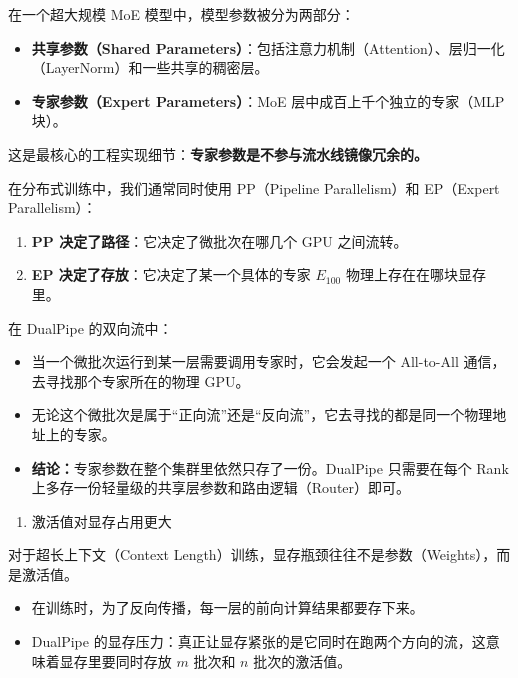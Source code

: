 在一个超大规模 MoE 模型中，模型参数被分为两部分：

\begin{itemize}
\tightlist
\item
  \textbf{共享参数（Shared Parameters）}：包括注意力机制（Attention）、层归一化（LayerNorm）和一些共享的稠密层。
\item
  \textbf{专家参数（Expert Parameters）}：MoE 层中成百上千个独立的专家（MLP 块）。
\end{itemize}

这是最核心的工程实现细节：\textbf{专家参数是不参与流水线镜像冗余的。}

在分布式训练中，我们通常同时使用 PP（Pipeline Parallelism）和 EP（Expert Parallelism）：

\begin{enumerate}
\def\labelenumi{\arabic{enumi}.}
\tightlist
\item
  \textbf{PP 决定了路径}：它决定了微批次在哪几个 GPU 之间流转。
\item
  \textbf{EP 决定了存放}：它决定了某一个具体的专家 \(E_{100}\) 物理上存在在哪块显存里。
\end{enumerate}

在 DualPipe 的双向流中：

\begin{itemize}
\tightlist
\item
  当一个微批次运行到某一层需要调用专家时，它会发起一个 All-to-All 通信，去寻找那个专家所在的物理 GPU。
\item
  无论这个微批次是属于``正向流''还是``反向流''，它去寻找的都是同一个物理地址上的专家。
\item
  \textbf{结论：}专家参数在整个集群里依然只存了一份。DualPipe 只需要在每个 Rank 上多存一份轻量级的共享层参数和路由逻辑（Router）即可。
\end{itemize}

\begin{enumerate}
\def\labelenumi{\arabic{enumi}.}
\setcounter{enumi}{1}
\tightlist
\item
  激活值对显存占用更大
\end{enumerate}

对于超长上下文（Context Length）训练，显存瓶颈往往不是参数（Weights），而是激活值。

\begin{itemize}
\tightlist
\item
  在训练时，为了反向传播，每一层的前向计算结果都要存下来。
\item
  DualPipe 的显存压力：真正让显存紧张的是它同时在跑两个方向的流，这意味着显存里要同时存放 \(m\) 批次和 \(n\) 批次的激活值。
\end{itemize}

